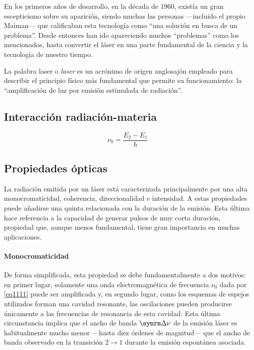 En los primeros años de desarrollo, en la década de $1960$, existía un gran escepticismo sobre su aparición, siendo muchas las personas ---incluido el propio Maiman--- que calificaban esta tecnología como \enquote{una solución en busca de un problema}. Desde entonces han ido apareciendo muchos \enquote{problemas} como los mencionados, hasta convertir el láser en una parte fundamental de la ciencia y la tecnología de nuestro tiempo.

La palabra \acrshort{laser} o \emph{\acrlong{laser}} es un acrónimo de origen anglosajón empleado para describir el principio físico más fundamental que permite su funcionamiento: la \enquote{amplificación de luz por emisión estimulada de radiación}.

\subsection{Interacción radiación-materia} \label{sec111}

\begin{equation}
    \label{eq1111}
    \nu_0 = \dfrac{E_2-E_1}{h}
\end{equation}

\subsection{Propiedades ópticas} \label{sec112}
La radiación emitida por un láser está caracterizada principalmente por una alta monocromaticidad, coherencia, direccionalidad e intensidad. A estas propiedades puede añadirse una quinta relacionada con la duración de la emisión\autocite{Svelto2010PrinciplesLasers}. Esta última hace referencia a la capacidad de generar pulsos de muy corta duración, propiedad que, aunque menos fundamental, tiene gran importancia en muchas aplicaciones. 

\paragraph{Monocromaticidad} \label{par1121}
De forma simplificada, esta propiedad se debe fundamentalmente a dos motivos: en primer lugar, solamente una onda electromagnética de frecuencia $\nu_0$ dada por \eqref{eq1111} puede ser amplificada y, en segundo lugar, como los esquemas de espejos utilizados forman una cavidad resonante, las oscilaciones pueden producirse únicamente a las frecuencias de resonancia de esta cavidad. Esta última circunstancia implica que el ancho de banda $\del\nu$ de la emisión láser es habitualmente mucho menor ---hasta diez órdenes de magnitud--- que el ancho de banda observado en la transición $2\rightarrow 1$ durante la emisión espontánea asociada.

